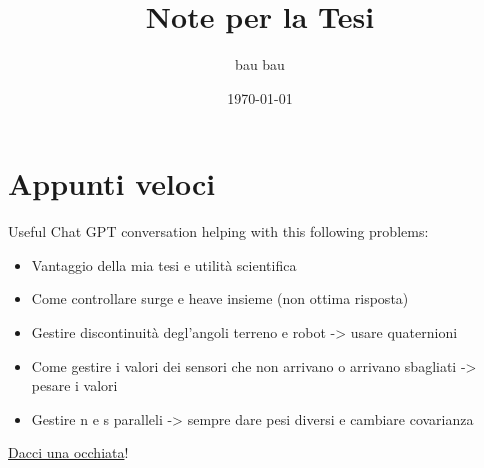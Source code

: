 \documentclass[12pt,a4paper]{article}
\title{Note per la Tesi}
\author{bau bau}
\date{\today}
\begin{document}
\maketitle

\section{Appunti veloci}

Useful Chat GPT conversation helping with this following problems:\\
\begin{itemize}
    \item Vantaggio della mia tesi e utilità scientifica\\
    \item Come controllare surge e heave insieme (non ottima risposta)\\
    \item Gestire discontinuità degl'angoli terreno e robot -> usare quaternioni\\
    \item Come gestire i valori dei sensori che non arrivano o arrivano sbagliati -> pesare i valori\\
    \item Gestire n e s paralleli -> sempre dare pesi diversi e cambiare covarianza\\
\end{itemize}

\href{https://chatgpt.com/share/686d001f-fa28-8004-a8b7-eec4cea88c3a}{Dacci una occhiata}!
\\




\end{document}
